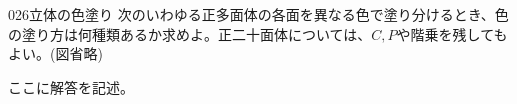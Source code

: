 \begin{prob}{026}{}{立体の色塗り}
 次のいわゆる正多面体の各面を異なる色で塗り分けるとき、色の塗り方は何種類あるか求めよ。正二十面体については、$C,P$や階乗を残してもよい。(図省略)
\end{prob}
ここに解答を記述。